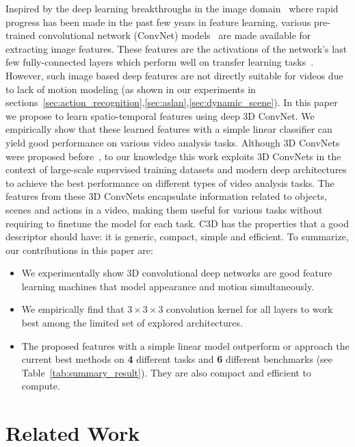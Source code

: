 \documentclass[10pt,twocolumn,letterpaper]{article}
\begin{document}
Inspired by the deep learning breakthroughs in the image domain~\cite{Krizhevsky12} where rapid progress has been made in the past few years in feature learning, various pre-trained convolutional network (ConvNet) models~\cite{jia2014caffe} are made available for extracting image features. These features are the activations of the network's last few fully-connected layers which perform well on transfer learning tasks~\cite{Ning14,Zhou2014}. However, such image based deep features are not directly suitable for videos due to lack of motion modeling (as shown in our experiments in sections~\ref{sec:action_recognition},\ref{sec:aslan},\ref{sec:dynamic_scene}). In this paper we propose to learn spatio-temporal features using deep $3$D ConvNet. We empirically show that these learned features with a simple linear classifier can yield good performance on various video analysis tasks. Although $3$D ConvNets were proposed before~\cite{Ming2013,Karpathy14}, to our knowledge this work exploits 3D ConvNets in the context of large-scale supervised training datasets and modern deep architectures to achieve the best performance on different types of video analysis tasks. The features from these 3D ConvNets encapsulate information related to objects, scenes and actions in a video, making them useful for various tasks without requiring to finetune the model for each task. C3D has the properties that a good descriptor should have: it is generic, compact, simple and efficient. To summarize, our contributions in this paper are:

\begin{itemize}
\item We experimentally show 3D convolutional deep networks are good feature learning machines that model appearance and motion simultaneously.
\vspace{-5pt}
\item We empirically find that $3 \times 3 \times 3$ convolution kernel for all layers to work best among the limited set of explored architectures.
\vspace{-5pt}
\item The proposed features with a simple linear model outperform or approach the current best methods on {\bf 4} different tasks and {\bf 6} different benchmarks (see Table~\ref{tab:summary_result}). They are also compact and efficient to compute.
\end{itemize}
 
\vspace{-6pt}
\section{Related Work}
\label{sec:relwork}
\end{document}
